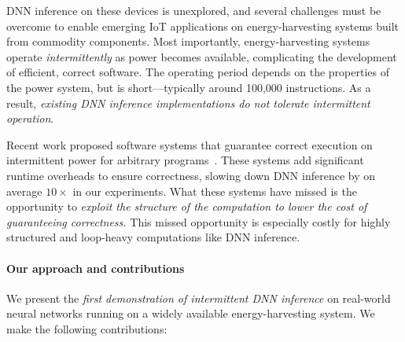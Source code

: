 DNN inference on these devices is unexplored, and several challenges
must be overcome to enable emerging IoT applications on
energy-harvesting systems built from commodity components.
%
Most importantly, energy-harvesting systems operate
\emph{intermittently} as power becomes available, complicating the
development of efficient, correct software.
%
The operating period depends on the properties of the
power system, but is short---typically around 100,000 instructions.
%
As a result, \emph{existing DNN inference implementations do not tolerate 
  intermittent operation}.

Recent work proposed software systems that guarantee correct
execution on intermittent power for arbitrary
programs~\cite{dino,ratchet,clank,chain,alpaca,mayfly}.
%
These systems add significant runtime overheads to ensure correctness,
slowing down DNN inference by on average $10\times$ in our experiments.
%
What these systems have missed is the opportunity to \emph{exploit the
  structure of the computation to lower the cost of guaranteeing correctness.}
%
This missed opportunity is especially costly for highly structured and
loop-heavy computations like DNN inference.

\paragraph{Our approach and contributions}
%
We present the \emph{first demonstration of intermittent DNN
inference} on real-world neural networks running on a widely
available energy-harvesting system.
%
We make the following contributions:

